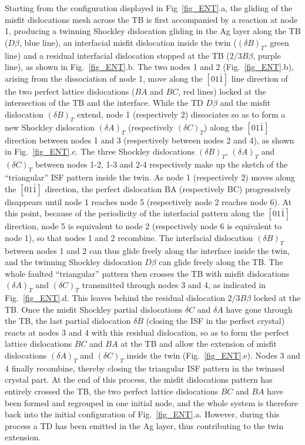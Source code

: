 \documentclass[final,3p,times,twocolumn]{elsarticle}
\begin{document}
Starting from the configuration displayed in Fig~\ref{fig_ENT}.a, the gliding of the misfit dislocations mesh across the TB is first accompanied by a reaction at node 1, producing a twinning  Shockley dislocation gliding in the Ag layer along the TB ($D\beta$, blue line), an interfacial misfit dislocation inside the twin ($(\delta B)_T$, green line) and a residual interfacial dislocation stopped at the TB ($2/3 B\beta$, purple line), as shown in Fig.~\ref{fig_ENT}.b. The two  nodes 1 and 2 (Fig.~\ref{fig_ENT}.b), arising from the dissociation of node 1, move along the $\left[ 01 \bar{1} \right]$ line direction of the two perfect lattice dislocations ($BA$ and $BC$, red lines) locked at the intersection of the TB and the interface. While the TD $D\beta$ and the misfit dislocation $(\delta B)_T$ extend, node 1 (respectively 2) dissociates so as to form a new Shockley dislocation $(\delta A)_T$ (respectively $(\delta C)_T$) along the $\left[ 01\bar{1} \right]$ direction between nodes 1 and 3 (respectively between nodes 2 and 4), as shown in Fig.~\ref{fig_ENT}.c. The three Shockley dislocations $(\delta B)_T$, $(\delta A)_T$ and $(\delta C)_T$ between nodes 1-2, 1-3 and 2-4 respectively make up the sketch of the ``triangular'' ISF pattern inside the twin. As node 1 (respectively 2) moves along the $\left[ 01\bar{1} \right]$ direction, the perfect dislocation BA (respectively BC) progressively disappears until node 1 reaches node 5 (respectively node 2 reaches node 6). At this point, because of the periodicity of the interfacial pattern along the $\left[ 01\bar{1} \right]$ direction, node 5 is equivalent to node 2 (respectively node 6 is equivalent to node 1), so that nodes 1 and 2 recombine. The interfacial dislocation $(\delta B)_T$ between nodes 1 and 2 can thus glide freely along the interface inside the twin, and the twinning Shockley dislocation $D\beta$ can glide freely along the TB. 
The whole faulted ``triangular'' pattern then crosses the TB with misfit dislocations $(\delta A)_T$ and $(\delta C)_T$ transmitted through nodes 3 and 4, as indicated in Fig.~\ref{fig_ENT}.d. This leaves behind the residual dislocation $2/3 B\beta$ locked at the TB. Once the misfit Shockley partial dislocations $\delta C$ and $\delta A$ have gone through the TB, the last partial dislocation $\delta B$ (closing the ISF in the perfect crystal) reacts at nodes 3 and 4 with this residual dislocation, so as to form the perfect lattice dislocations $BC$ and $BA$ at the TB and allow the extension of misfit dislocations $(\delta A)_T$ and $(\delta C)_T$ inside the twin (Fig.~\ref{fig_ENT}.e). Nodes 3 and 4 finally recombine, thereby closing the triangular ISF pattern in the twinned crystal part. At the end of this process, the misfit dislocations pattern has entirely crossed the TB, the two perfect lattice dislocations $BC$ and $BA$ have been formed and regrouped in one initial node, and the whole system is therefore back into the initial configuration of Fig.~\ref{fig_ENT}.a. However, during this process a TD has been emitted in the Ag layer, thus contributing to the twin extension.
\end{document}
